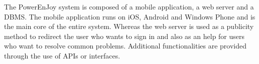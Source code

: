 The PowerEnJoy system is composed of a mobile application, a web server and a DBMS. The mobile application runs on iOS, Android and Windows Phone and is the main core of the entire system. Whereas the web server is used as a publicity method to redirect the user who wants to sign in and also as an help for users who want to resolve common problems.  Additional functionalities are provided through the use of APIs or interfaces.